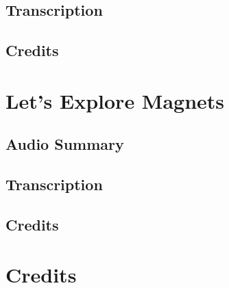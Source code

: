 \subsection{Transcription}

\subsection{Credits}

\section{Let's Explore Magnets}

\subsection{Audio Summary}

\subsection{Transcription}

\subsection{Credits}

\section{Credits}